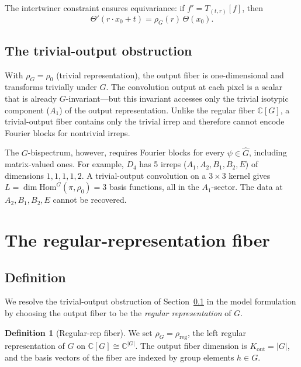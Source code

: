 \documentclass{article}
\theoremstyle{definition}
\newtheorem{definition}[theorem]{Definition}
\theoremstyle{remark}
\newcommand{\C}{\mathbb{C}}
\newcommand{\Ghat}{\widehat{G}}
\newcommand{\Hom}{\mathrm{Hom}}
\begin{document}
The intertwiner constraint ensures equivariance: if $f' = T_{(t, r)}[f]$, then
\begin{equation}\label{eq:equiv_general}
\Theta'(r \cdot x_0 + t) = \rho_G(r)\, \Theta(x_0).
\end{equation}

\subsection{The trivial-output obstruction}\label{sec:obstruction}

With $\rho_G = \rho_0$ (trivial representation), the output fiber is one-dimensional and transforms trivially under $G$. The convolution output at each pixel is a scalar that is already $G$-invariant---but this invariant accesses only the trivial isotypic component ($A_1$) of the output representation. Unlike the regular fiber $\C[G]$, a trivial-output fiber contains only the trivial irrep and therefore cannot encode Fourier blocks for nontrivial irreps.

The $G$-bispectrum, however, requires Fourier blocks for every $\psi \in \Ghat$, including matrix-valued ones. For example, $D_4$ has 5 irreps ($A_1, A_2, B_1, B_2, E$) of dimensions $1, 1, 1, 1, 2$. A trivial-output convolution on a $3 \times 3$ kernel gives $L = \dim\Hom^G(\pi, \rho_0) = 3$ basis functions, all in the $A_1$-sector. The data at $A_2, B_1, B_2, E$ cannot be recovered.

\section{The regular-representation fiber}

\subsection{Definition}

We resolve the trivial-output obstruction of Section~\ref{sec:obstruction} in the model formulation by choosing the output fiber to be the \textit{regular representation} of $G$.

\begin{definition}[Regular-rep fiber]\label{def:regrep}
We set $\rho_G = \rho_{\mathrm{reg}}$, the left regular representation of $G$ on $\C[G] \cong \C^{|G|}$. The output fiber dimension is $K_{\mathrm{out}} = |G|$, and the basis vectors of the fiber are indexed by group elements $h \in G$.
\end{definition}
\end{document}

